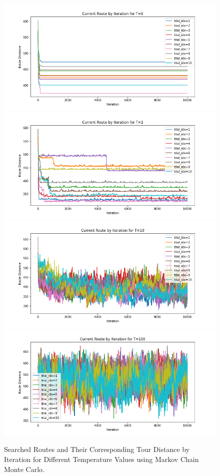 \documentclass[12pt]{article}
\begin{document}
\begin{enumerate}[label=(\alph*)]
    \begin{figure}[!ht]
      \centering
      \includegraphics[scale=0.32]{figures/route_by_iteration_t=0.png}
      \includegraphics[scale=0.32]{figures/route_by_iteration_t=1.png}
      \includegraphics[scale=0.32]{figures/route_by_iteration_t=10.png}
      \includegraphics[scale=0.32]{figures/route_by_iteration_t=100.png}
      \caption{Searched Routes and Their Corresponding Tour Distance by Iteration for Different Temperature Values using Markov Chain Monte Carlo.}
      \label{fig:iteration_mcmc}
    \end{figure}


\end{enumerate}
\end{document}
